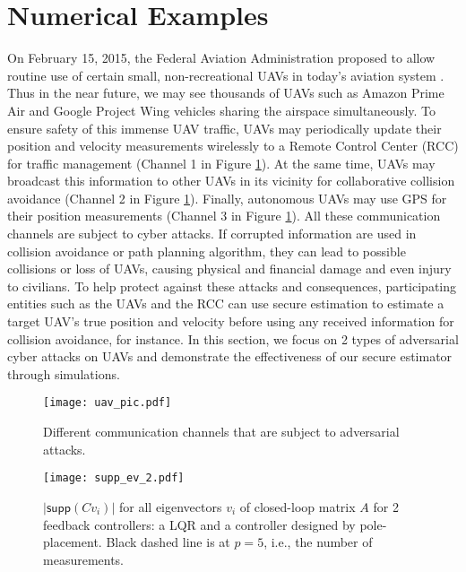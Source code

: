 \documentclass[journal]{IEEEtran}
\begin{document}
\section{Numerical Examples}\label{sec:examples}

On February 15, 2015, the Federal Aviation Administration proposed to allow routine use of certain small, non-recreational UAVs in today's aviation system \cite{faa}. Thus in the near future, we may see thousands of UAVs such as Amazon Prime Air \cite{Amazon} and Google Project Wing vehicles \cite{Google} sharing the airspace simultaneously. To ensure safety of this immense UAV traffic, UAVs may periodically update their position and velocity measurements wirelessly to a Remote Control Center (RCC) for traffic management (Channel 1 in Figure \ref{fig:ex_uav_pic}). At the same time, UAVs may broadcast this information to other UAVs in its vicinity for collaborative collision avoidance (Channel 2 in Figure \ref{fig:ex_uav_pic}). Finally, autonomous UAVs may use GPS for their position measurements (Channel 3 in Figure \ref{fig:ex_uav_pic}). 
All these communication channels are subject to cyber attacks. 
If corrupted information are used in collision avoidance or path planning algorithm, they can lead to possible collisions or loss of UAVs, causing physical and financial damage and even injury to civilians.
To help protect against these attacks and consequences, participating entities such as the UAVs and the RCC can use secure estimation to estimate a target UAV's true position and velocity before using any received information for collision avoidance, for instance.
In this section, we focus on 2 types of adversarial cyber attacks on UAVs and demonstrate the effectiveness of our secure estimator through simulations.

\begin{figure}
\center
\texttt{[image: uav\_pic.pdf]}
\caption{Different communication channels that are subject to adversarial attacks.}
\label{fig:ex_uav_pic}
\end{figure}



\begin{figure}[b]
\center
\texttt{[image: supp\_ev\_2.pdf]}
\caption{$ \lvert \textsf{supp} (C v_i) \rvert $ for all eigenvectors $v_i$ of closed-loop matrix $A$ for 2 feedback controllers: a LQR and a controller designed by pole-placement. Black dashed line is at $p = 5$, i.e., the number of measurements.}
\label{fig:ex_pole}
\end{figure}
\end{document}
